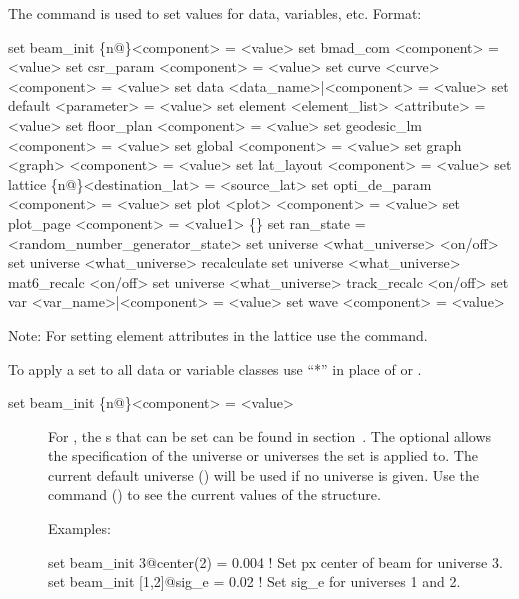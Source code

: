 {{The  command is used to set values for data,
variables, etc. Format:
\begin{example}
  set beam_init \{n@\}<component> = <value>
  set bmad_com <component> = <value>
  set csr_param <component> = <value>
  set curve <curve> <component> = <value>
  set data <data_name>|<component> = <value>
  set default <parameter> = <value>
  set element <element_list> <attribute> = <value>
  set floor_plan <component> = <value>
  set geodesic_lm <component> = <value>
  set global <component> = <value>
  set graph <graph> <component> = <value>
  set lat_layout <component> = <value>
  set lattice \{n@\}<destination\_lat> = <source\_lat>
  set opti_de_param <component> = <value>
  set plot <plot> <component> = <value>
  set plot_page <component> = <value1> \{<value2>\}
  set ran_state = <random_number_generator_state>
  set universe <what_universe> <on/off>
  set universe <what_universe> recalculate
  set universe <what_universe> mat6_recalc <on/off>
  set universe <what_universe> track_recalc <on/off>
  set var <var_name>|<component> = <value>
  set wave <component> = <value>
\end{example}

\vskip 0.2in 

Note: For setting element attributes in the 
lattice use the  command.

To apply a set to all data or variable classes use ``*''
in place of  or .



\begin{description}

\item[set beam\_init \{n@\}<component> = <value>] \Newline

\vskip -0.2in

For , the s that can be set can be
found in section~. The optional  allows the
specification of the universe or universes the set is applied to. The
current default universe () will be used if no
universe is given. Use the  command () to
see the current values of the  structure.

Examples:
\begin{example}
  set beam_init 3@center(2) = 0.004  ! Set px center of beam for universe 3.
  set beam_init [1,2]@sig_e = 0.02   ! Set sig_e for universes 1 and 2.
\end{example}


\end{description}}}
